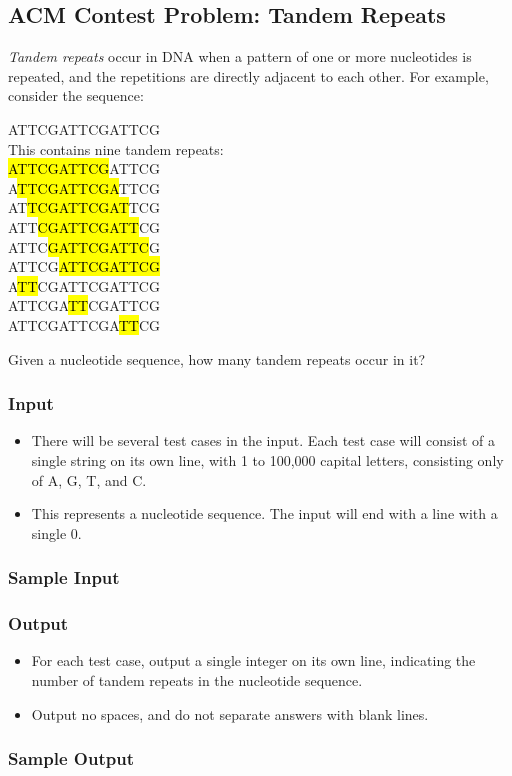 \subsection{ACM Contest Problem: Tandem Repeats\cite{acmsoutheastregional2013}}
\textit{Tandem repeats} occur in DNA when a pattern of one or more nucleotides is repeated, and the repetitions are directly adjacent to each other.
For example, consider the sequence:
\begin{center}
	ATTCGATTCGATTCG\\
	This contains nine tandem repeats:\\
	\hl{ATTCGATTCG}ATTCG\\
	A\hl{TTCGATTCGA}TTCG\\
	AT\hl{TCGATTCGAT}TCG\\
	ATT\hl{CGATTCGATT}CG\\
	ATTC\hl{GATTCGATTC}G\\
	ATTCG\hl{ATTCGATTCG}\\
	A\hl{TT}CGATTCGATTCG\\
	ATTCGA\hl{TT}CGATTCG\\
	ATTCGATTCGA\hl{TT}CG\\
\end{center}

Given a nucleotide sequence, how many tandem repeats occur in it?

\subsubsection{Input}
\begin{itemize}
	\item There will be several test cases in the input.
	Each test case will consist of a single string on its own line, with 1 to 100,000 capital letters, consisting only of A, G, T, and C.
	\item This represents a nucleotide sequence.
	The input will end with a line with a single 0.
\end{itemize}

\subsubsection{Sample Input}


\subsubsection{Output}
\begin{itemize}
	\item For each test case, output a single integer on its own line, indicating the number of tandem repeats in the nucleotide sequence.
	\item Output no spaces, and do not separate answers with blank lines.
\end{itemize}

\subsubsection{Sample Output}

